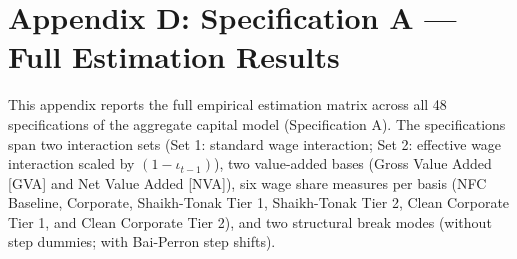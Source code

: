 \section{Appendix D: Specification A --- Full Estimation Results}
\label{app:specA_full_results}

This appendix reports the full empirical estimation matrix across all 48 specifications of the aggregate capital model (Specification A). The specifications span two interaction sets (Set 1: standard wage interaction; Set 2: effective wage interaction scaled by $(1-\iota_{t-1})$), two value-added bases (Gross Value Added [GVA] and Net Value Added [NVA]), six wage share measures per basis (NFC Baseline, Corporate, Shaikh-Tonak Tier 1, Shaikh-Tonak Tier 2, Clean Corporate Tier 1, and Clean Corporate Tier 2), and two structural break modes (without step dummies; with Bai-Perron step shifts).

